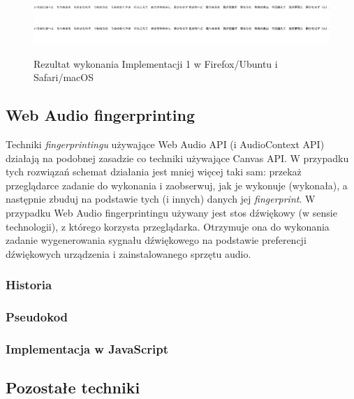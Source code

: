 \begin{figure}
	\includegraphics[trim={0 121px 2269px 0},clip,frame]{img/06}
	\includegraphics[trim={0 121px 2269px 0},clip,frame]{img/07}
	\caption{Rezultat wykonania Implementacji 1 w Firefox/Ubuntu i Safari/macOS}
\end{figure}

\subsection{Web Audio fingerprinting}
Techniki \emph{fingerprintingu} używające Web Audio API (i AudioContext API)
działają na podobnej zasadzie co techniki używające Canvas API. W przypadku tych
rozwiązań schemat działania jest mniej więcej taki sam: przekaż przeglądarce
zadanie do wykonania i zaobserwuj, jak je wykonuje (wykonała), a następnie
zbuduj na podstawie tych (i innych) danych jej \emph{fingerprint}. W przypadku
Web Audio fingerprintingu używany jest stos dźwiękowy (w sensie technologii), z
którego korzysta przeglądarka. Otrzymuje ona do wykonania zadanie wygenerowania
sygnału dźwiękowego na podstawie preferencji dźwiękowych urządzenia i
zainstalowanego sprzętu audio.

\subsubsection{Historia}

\subsubsection{Pseudokod}

\subsubsection{Implementacja w JavaScript}

\subsection{Pozostałe techniki}


